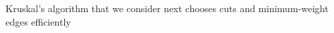 \documentclass[8pt,a4paper,compress]{beamer}
\begin{document}
\begin{frame}[fragile]
\begin{minipage}{200pt}
Kruskal's algorithm that we consider next chooses cuts and minimum-weight edges efficiently
\end{minipage}%
\begin{minipage}{100pt}
\begin{center}
\end{center}
\end{minipage}
\end{frame}
\end{document}
